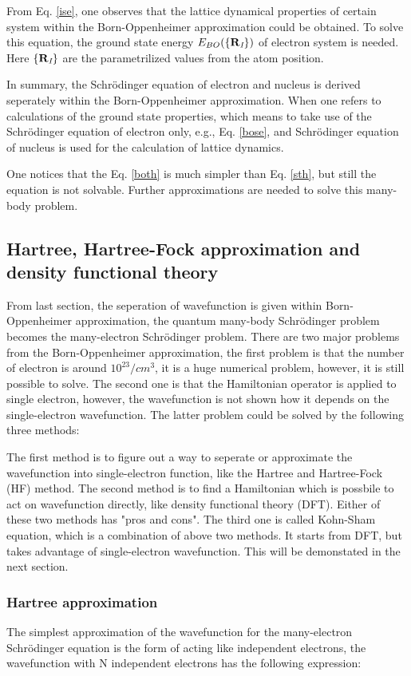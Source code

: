 \documentclass[a4paper, 12pt, titlepage,oneside,drop]{kthesis}
\begin{document}
From Eq. \ref{ise}, one observes that the lattice dynamical properties of certain system within the Born-Oppenheimer approximation could be obtained. To solve this equation,
the ground state energy $E_{BO}(\{{{\textbf R}_{\textit I}}\})$ of electron system is needed. Here $\{{\textbf R}_{\textit I}\}$ are the parametrilized values from the atom position.
 
In summary, the Schrödinger equation of electron and nucleus is derived seperately within the Born-Oppenheimer approximation. When one refers to calculations of the ground state properties,
which means to take use of the Schrödinger equation of electron only, e.g., Eq. \ref{bose}, and Schrödinger equation of nucleus is used for the calculation of lattice dynamics.

One notices that the Eq. \ref{both} is much simpler than Eq. \ref{sth}, but still the equation is not solvable. Further approximations  are needed
to solve this many-body problem.

\subsection{Hartree, Hartree-Fock approximation and density functional theory}

From last section, the seperation of wavefunction is given within Born-Oppenheimer approximation, the quantum many-body Schrödinger problem becomes the many-electron 
Schrödinger problem. There are two major problems from the Born-Oppenheimer approximation, the first problem is that the number of electron is around $10^{23}/cm^3$, it is a huge numerical problem, however, it is still possible to solve.
The second one is that the Hamiltonian operator is applied to single electron, however, the wavefunction is not shown how it depends on the single-electron wavefunction. The latter problem 
could be solved by the following three methods:

The first method is to figure out a way to seperate or approximate the wavefunction into single-electron function, like the Hartree and Hartree-Fock (HF) method. The second method is to
find a Hamiltonian which is possbile to act on wavefunction directly, like density functional theory (DFT). Either of these two methods has "pros and cons". The third one is called Kohn-Sham equation,
which is a combination of above two methods. It starts from DFT, but takes advantage of single-electron wavefunction. This will be demonstated in the next section.

\subsubsection{Hartree approximation}
\label{ha}
The simplest approximation of the wavefunction for the many-electron Schrödinger equation is the form of acting like independent
electrons, the wavefunction with N independent electrons has the following expression:
\end{document}
